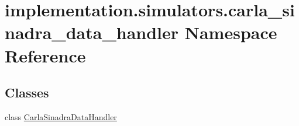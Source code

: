 \hypertarget{namespaceimplementation_1_1simulators_1_1carla__sinadra__data__handler}{}\section{implementation.\+simulators.\+carla\+\_\+sinadra\+\_\+data\+\_\+handler Namespace Reference}
\label{namespaceimplementation_1_1simulators_1_1carla__sinadra__data__handler}
\subsection*{Classes}
\begin{DoxyCompactItemize}
\item 
class \hyperlink{classimplementation_1_1simulators_1_1carla__sinadra__data__handler_1_1_carla_sinadra_data_handler}{Carla\+Sinadra\+Data\+Handler}
\end{DoxyCompactItemize}
